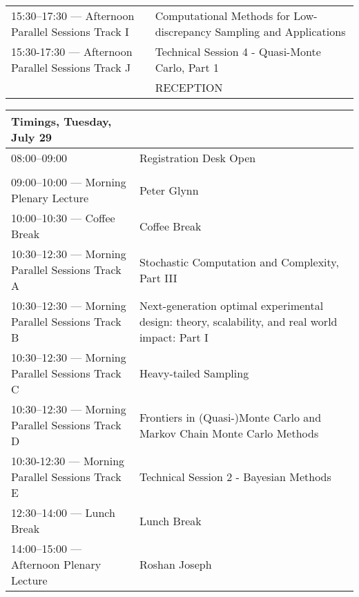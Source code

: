 \begin{sideways}
\begin{tabular}{l|l}
\cellcolor{\SessionTitleColor}15:30–17:30 — Afternoon Parallel Sessions Track I & \cellcolor{\SessionTitleColor}Computational Methods for Low-discrepancy Sampling and Applications \\
\cellcolor{\SessionLightColor}15:30-17:30 — Afternoon Parallel Sessions Track J & \cellcolor{\SessionLightColor}Technical Session 4 - Quasi-Monte Carlo, Part 1 \\
\cellcolor{\EmptyColor} & \cellcolor{\EmptyColor}RECEPTION \\
\hline
\end{tabular}
\end{sideways}

\begin{sideways}
\begin{tabular}{l|l}
\hline
\large\textbf{Timings, Tuesday, 
 July 29} & \large\textbf{} \\
\hline
\cellcolor{\EmptyColor}08:00–09:00 & \cellcolor{\EmptyColor}Registration Desk Open \\
\cellcolor{\SessionTitleColor} & \cellcolor{\SessionTitleColor} \\
\cellcolor{\PlenaryColor}09:00–10:00 — Morning Plenary Lecture & \cellcolor{\PlenaryColor}Peter Glynn \\
\cellcolor{\EmptyColor}10:00–10:30 — Coffee Break & \cellcolor{\EmptyColor}Coffee Break \\
\cellcolor{\SessionTitleColor}10:30–12:30 — Morning Parallel Sessions Track A & \cellcolor{\SessionTitleColor}Stochastic Computation and Complexity, Part III \\
\cellcolor{\SessionTitleColor}10:30–12:30 — Morning Parallel Sessions Track B & \cellcolor{\SessionTitleColor}Next-generation optimal experimental design: theory, scalability, and real world impact: Part I \\
\cellcolor{\SessionTitleColor}10:30–12:30 — Morning Parallel Sessions Track C & \cellcolor{\SessionTitleColor}Heavy-tailed Sampling \\
\cellcolor{\SessionTitleColor}10:30–12:30 — Morning Parallel Sessions Track D & \cellcolor{\SessionTitleColor}Frontiers in (Quasi-)Monte Carlo and Markov Chain Monte Carlo Methods \\
\cellcolor{\SessionLightColor}10:30-12:30 — Morning Parallel Sessions Track E & \cellcolor{\SessionLightColor}Technical Session 2 - Bayesian Methods \\
\cellcolor{\EmptyColor}12:30–14:00 — Lunch Break & \cellcolor{\EmptyColor}Lunch Break \\
\cellcolor{\PlenaryColor}14:00–15:00 — Afternoon Plenary Lecture & \cellcolor{\PlenaryColor}Roshan Joseph \\

\end{tabular}
\end{sideways}
